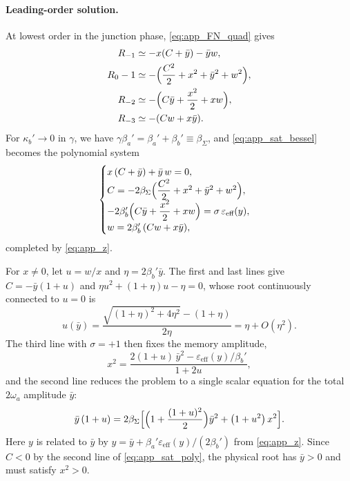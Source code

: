 \documentclass[aps,prx,reprint,floatfix,amsmath,amssymb,longbibliography]{revtex4-2}
\begin{document}
\paragraph*{Leading-order solution.}
At lowest order in the junction phase, \cref{eq:app_FN_quad} gives
\begin{equation}
\begin{split}
    R_{-1}&\simeq -x(C+\bar y)-\bar y w,\\
    R_0-1&\simeq -\Bigl(\frac{C^2}{2}+x^2+\bar y^2+w^2\Bigr),\\
    R_{-2}&\simeq -\Bigl(C\bar y+\frac{x^2}{2}+xw\Bigr),\\
    R_{-3}&\simeq -(Cw+x\bar y).
\end{split}
\end{equation}
For $\kappa_b'\to0$ in $\gamma$, we have $\gamma\beta_a'=\beta_a'+\beta_b'\equiv\beta_\Sigma$, and \cref{eq:app_sat_bessel} becomes the polynomial system
\begin{equation}
\begin{cases}
    x\,(C+\bar y) + \bar y\,w = 0,\\
    C = -2\beta_\Sigma\Bigl(\dfrac{C^2}{2}+x^2+\bar y^2+w^2\Bigr),\\
    -2\beta_b'\Bigl(C\bar y+\dfrac{x^2}{2}+xw\Bigr) = \sigma\,\varepsilon_\text{eff}(y),\\
    w = 2\beta_b'\,(Cw+x\bar y),
\end{cases}
\label{eq:app_sat_poly}
\end{equation}
completed by \cref{eq:app_z}.

For $x\neq0$, let $u=w/x$ and $\eta=2\beta_b'\bar y$. The first and last lines give $C=-\bar y(1+u)$ and $\eta u^2+(1+\eta)u-\eta=0$, whose root continuously connected to $u=0$ is
\begin{equation}
    u(\bar y) = \frac{\sqrt{(1+\eta)^2+4\eta^2}-(1+\eta)}{2\eta} = \eta + O(\eta^2).
\end{equation}
The third line with $\sigma=+1$ then fixes the memory amplitude,
\begin{equation}
    x^2 = \frac{2(1+u)\,\bar y^2 - \varepsilon_\text{eff}(y)/\beta_b'}{1+2u},
\end{equation}
and the second line reduces the problem to a single scalar equation for the total $2\omega_a$ amplitude $\bar y$:
\begin{equation}
    \bar y\,(1+u) = 2\beta_\Sigma\Bigl[\Bigl(1+\frac{(1+u)^2}{2}\Bigr)\bar y^2 + \bigl(1+u^2\bigr)\,x^2\Bigr].
    \label{eq:app_sat_scalar}
\end{equation}
Here $y$ is related to $\bar y$ by $y=\bar y+\beta_a'\varepsilon_\text{eff}(y)/(2\beta_b')$ from \cref{eq:app_z}. Since $C<0$ by the second line of \cref{eq:app_sat_poly}, the physical root has $\bar y>0$ and must satisfy $x^2>0$.
\end{document}
